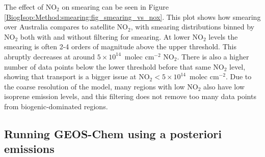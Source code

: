       The effect of NO$_2$ on smearing can be seen in Figure \ref{BiogIsop:Method:smearing:fig_smearing_vs_nox}.
      This plot shows how smearing over Australia compares to satellite NO$_2$, with smearing distributions binned by NO$_2$ both with and without filtering for smearing.
      At lower NO$_2$ levels the smearing is often 2-4 orders of magnitude above the upper threshold. 
      This abruptly decreases at around $5 \times 10^{14} $~molec cm$^{-2}$ NO$_2$.
      There is also a higher number of data points below the lower threshold before that same NO$_2$ level, showing that transport is a bigger issue at NO$_2 < 5 \times 10^{14} $~molec cm$^{-2}$. 
      Due to the coarse resolution of the model, many regions with low NO$_2$ also have low isoprene emission levels, and this filtering does not remove too many data points from biogenic-dominated regions.
      
      
  \subsection{Running GEOS-Chem using a posteriori emissions}
  \label{BioIsop:method:scaled}
    
